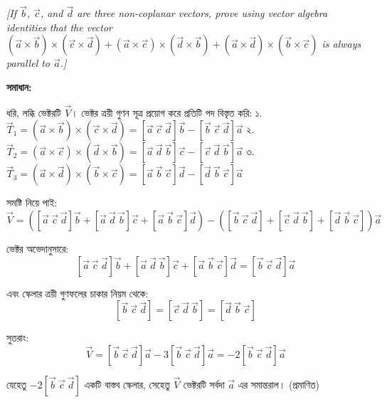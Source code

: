 \documentclass[11pt,a4paper]{article}
\begin{document}
\smallskip
\textit{[If $\vec{b}$, $\vec{c}$, and $\vec{d}$ are three non-coplanar vectors, prove using vector algebra identities that the vector $(\vec{a} \times \vec{b}) \times (\vec{c} \times \vec{d}) + (\vec{a} \times \vec{c}) \times (\vec{d} \times \vec{b}) + (\vec{a} \times \vec{d}) \times (\vec{b} \times \vec{c})$ is always parallel to $\vec{a}$.]}

\vspace{0.3cm}
\begin{center}
\end{center}

\textbf{সমাধান:}

ধরি, লব্ধি ভেক্টরটি $\vec{V}$। ভেক্টর ত্রয়ী গুণন সূত্র প্রয়োগ করে প্রতিটি পদ বিস্তৃত করি:
১. $\vec{T}_1 = (\vec{a} \times \vec{b}) \times (\vec{c} \times \vec{d}) = [\vec{a} \ \vec{c} \ \vec{d}]\vec{b} - [\vec{b} \ \vec{c} \ \vec{d}]\vec{a}$
২. $\vec{T}_2 = (\vec{a} \times \vec{c}) \times (\vec{d} \times \vec{b}) = [\vec{a} \ \vec{d} \ \vec{b}]\vec{c} - [\vec{c} \ \vec{d} \ \vec{b}]\vec{a}$
৩. $\vec{T}_3 = (\vec{a} \times \vec{d}) \times (\vec{b} \times \vec{c}) = [\vec{a} \ \vec{b} \ \vec{c}]\vec{d} - [\vec{d} \ \vec{b} \ \vec{c}]\vec{a}$

সমষ্টি নিয়ে পাই:
$$\vec{V} = \left( [\vec{a} \ \vec{c} \ \vec{d}]\vec{b} + [\vec{a} \ \vec{d} \ \vec{b}]\vec{c} + [\vec{a} \ \vec{b} \ \vec{c}]\vec{d} \right) - \left( [\vec{b} \ \vec{c} \ \vec{d}] + [\vec{c} \ \vec{d} \ \vec{b}] + [\vec{d} \ \vec{b} \ \vec{c}] \right)\vec{a}$$

ভেক্টর অভেদানুসারে:
$$[\vec{a} \ \vec{c} \ \vec{d}]\vec{b} + [\vec{a} \ \vec{d} \ \vec{b}]\vec{c} + [\vec{a} \ \vec{b} \ \vec{c}]\vec{d} = [\vec{b} \ \vec{c} \ \vec{d}]\vec{a}$$

এবং স্কেলার ত্রয়ী গুণফলের চাকার নিয়ম থেকে:
$$[\vec{b} \ \vec{c} \ \vec{d}] = [\vec{c} \ \vec{d} \ \vec{b}] = [\vec{d} \ \vec{b} \ \vec{c}]$$

সুতরাং:
$$\vec{V} = [\vec{b} \ \vec{c} \ \vec{d}]\vec{a} - 3[\vec{b} \ \vec{c} \ \vec{d}]\vec{a} = -2[\vec{b} \ \vec{c} \ \vec{d}]\vec{a}$$

যেহেতু $-2[\vec{b} \ \vec{c} \ \vec{d}]$ একটি বাস্তব স্কেলার, সেহেতু $\vec{V}$ ভেক্টরটি সর্বদা $\vec{a}$ এর সমান্তরাল। (প্রমাণিত)
\end{document}
